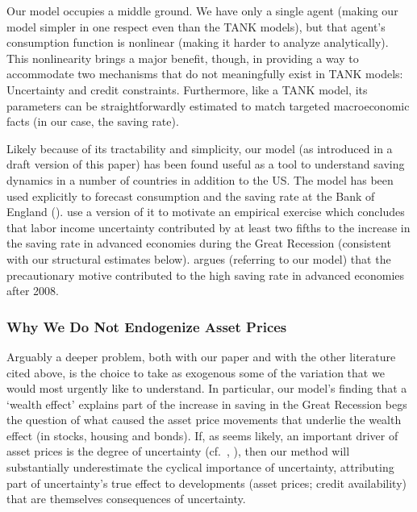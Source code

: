Our  model occupies a middle ground. We have only a single agent (making our model simpler in one respect even than the TANK models), but that agent's consumption function is nonlinear (making it harder to analyze analytically).  This nonlinearity brings a major benefit, though, in providing a way to accommodate two mechanisms that do not meaningfully exist in TANK models: Uncertainty and credit constraints.  Furthermore, like a TANK model, its parameters can be straightforwardly estimated to match targeted macroeconomic facts (in our case, the saving rate).

\hypertarget{Our-Model-Has-Been-Used-In-Other-Countries}{}
Likely because of its tractability and simplicity, our model (as introduced in a draft version of this paper) has been found useful as a tool to understand saving dynamics in a number of countries in addition to the US. The model has been used explicitly to forecast consumption and the saving rate at the Bank of England (\cite{BoE_forecasting}).  \cite{modyEtAl_precSaving} use a version of it to motivate an empirical exercise which concludes that labor income uncertainty contributed by at least two fifths to the increase in the saving rate in advanced economies during the Great Recession (consistent with our structural estimates below). \cite{Trichet_JacksonHoleSpeech} argues (referring to our model) that the precautionary motive contributed to the high saving rate in advanced economies after 2008.

\hypertarget{Why-We-Do-Not-Endogenize-Asset-Prices}{}

\subsubsection{Why We Do Not Endogenize Asset Prices}{}

Arguably a deeper problem, both with our paper and with the other literature cited above, is the choice to take as exogenous some of the variation that we would most urgently like to understand.  In particular, our model's finding that a `wealth effect' explains part of the increase in saving in the Great Recession begs the question of what caused the asset price movements that underlie the wealth effect (in stocks, housing and bonds). If, as seems likely, an important driver of asset prices is the degree of uncertainty (cf.\ \cite{bexUncertaintyAssetPrices}, \cite{drechslerUncertainty}), then our method will substantially underestimate the cyclical importance of uncertainty, attributing part of uncertainty's true effect to developments (asset prices; credit availability) that are themselves consequences of uncertainty.

